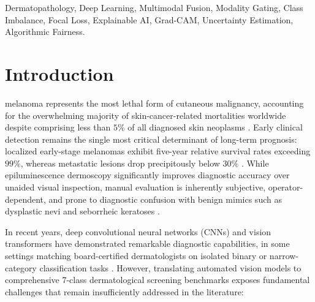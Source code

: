 \documentclass[journal,10pt,twocolumn]{IEEEtran}
\begin{document}
\begin{abstract}
than superficial regularizing noise. Omitting DullRazor artifact suppression reduced melanoma sensitivity by $-31.15\%$ ($59.02\% \to 27.87\%$), confirming that hair inpainting is an essential prerequisite for robust visual feature extraction. Finally, genuine Grad-CAM saliency heatmaps, SHAP feature attributions, Monte Carlo Dropout uncertainty calibration, and subgroup demographic fairness evaluations are systematically synthesized. This study establishes a reproducible benchmark and highlights critical trade-offs for responsible, multimodal clinical decision support.
\end{abstract}

\begin{IEEEkeywords}
Dermatopathology, Deep Learning, Multimodal Fusion, Modality Gating, Class Imbalance, Focal Loss, Explainable AI, Grad-CAM, Uncertainty Estimation, Algorithmic Fairness.
\end{IEEEkeywords}

\section{Introduction}
 melanoma represents the most lethal form of cutaneous malignancy, accounting for the overwhelming majority of skin-cancer-related mortalities worldwide despite comprising less than $5\%$ of all diagnosed skin neoplasms \cite{tschandl2018ham10000, esteva2017dermatologist}. Early clinical detection remains the single most critical determinant of long-term prognosis: localized early-stage melanomas exhibit five-year relative survival rates exceeding $99\%$, whereas metastatic lesions drop precipitously below $30\%$ \cite{esteva2017dermatologist}. While epiluminescence dermoscopy significantly improves diagnostic accuracy over unaided visual inspection, manual evaluation is inherently subjective, operator-dependent, and prone to diagnostic confusion with benign mimics such as dysplastic nevi and seborrheic keratoses \cite{tschandl2019comparison, tschandl2020human}.

In recent years, deep convolutional neural networks (CNNs) and vision transformers have demonstrated remarkable diagnostic capabilities, in some settings matching board-certified dermatologists on isolated binary or narrow-category classification tasks \cite{esteva2017dermatologist}. However, translating automated vision models to comprehensive 7-class dermatological screening benchmarks exposes fundamental challenges that remain insufficiently addressed in the literature:
\end{document}

